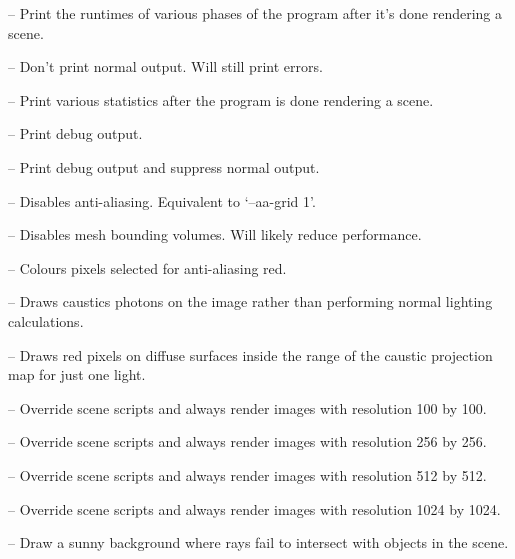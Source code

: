 \documentclass{article}
\begin{document}
\begin{itemize}
   -- Print the runtimes of various phases of the program
  after it's done rendering a scene.

   -- Don't print normal output. Will still print errors.

   -- Print various statistics after the program is done
  rendering a scene.

   -- Print debug output.

   -- Print debug output and suppress normal output.

   -- Disables anti-aliasing. Equivalent to `--aa-grid 1'.

   -- Disables mesh bounding volumes. Will likely reduce
  performance.

   -- Colours pixels selected for anti-aliasing red.

   -- Draws caustics photons on the image rather
  than performing normal lighting calculations.

   -- Draws red pixels on diffuse surfaces inside
  the range of the caustic projection map for just one light.

   -- Override scene scripts and always render images with
  resolution 100 by 100.

   -- Override scene scripts and always render images with
  resolution 256 by 256.

   -- Override scene scripts and always render images with
  resolution 512 by 512.

   -- Override scene scripts and always render images with
  resolution 1024 by 1024.

   -- Draw a sunny background where rays fail to intersect with
  objects in the scene.

\end{itemize}
\end{document}
